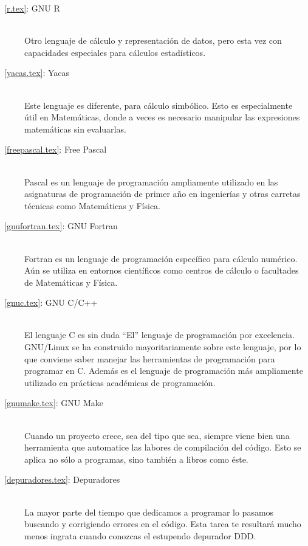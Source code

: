 \begin{description}
\item[\chaptername~\ref{r.tex}: GNU R] ~\\  Otro lenguaje de cálculo y
representación de datos, pero esta vez con capacidades especiales para
cálculos estadísticos.

\item[\chaptername~\ref{yacas.tex}:  Yacas]   ~\\  Este   lenguaje  es
diferente,  para  cálculo simbólico.  Esto  es  especialmente útil  en
Matemáticas,  donde a  veces  es necesario  manipular las  expresiones
matemáticas sin evaluarlas.

\item[\chaptername~\ref{freepascal.tex}: Free Pascal] ~\\ Pascal es un
lenguaje de  programación ampliamente utilizado en  las asignaturas de
programación de  primer año en  ingenierías y otras  carretas técnicas
como Matemáticas y Física.

\item[\chaptername~\ref{gnufortran.tex}:   GNU   Fortran]   ~\\   {\sf
Fortran}  es  un  lenguaje  de programación  específico  para  cálculo
numérico.  Aún se  utiliza  en entornos  científicos  como centros  de
cálculo o facultades de Matemáticas y Física.

\item[\chaptername~\ref{gnuc.tex}: GNU C/C++] ~\\ El lenguaje C es sin
duda ``El'' lenguaje  de programación por excelencia.  GNU/Linux se ha
construido mayoritariamente  sobre este lenguaje, por  lo que conviene
saber manejar  las herramientas de  programación para programar  en C.
Además es  el lenguaje  de programación  más ampliamente  utilizado en
prácticas académicas de programación.

\item[\chaptername~\ref{gnumake.tex}: GNU Make] ~\\ Cuando un proyecto
crece, sea  del tipo que sea,  siempre viene bien una  herramienta que
automatice las  labores de compilación  del código. Esto se  aplica no
sólo a programas, sino también a libros como éste.

\item[\chaptername~\ref{depuradores.tex}:  Depuradores]  ~\\ La  mayor
parte  del tiempo  que dedicamos  a  programar lo  pasamos buscando  y
corrigiendo errores en el código.  Esta tarea te resultará mucho menos
ingrata cuando conozcas el estupendo depurador DDD.


\end{description}
